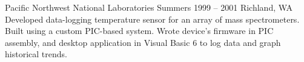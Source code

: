 {Pacific Northwest National Laboratories}
{Summers 1999 -- 2001}
{Richland, WA}
{Developed data-logging temperature sensor for an array of mass spectrometers. Built using a custom PIC-based system. Wrote device's firmware in PIC assembly, and desktop application in Visual Basic 6 to log data and graph historical trends.}
